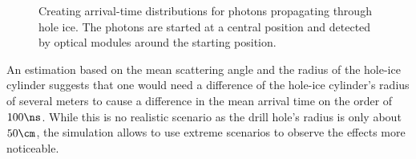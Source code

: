 
\begin{figure}[htbp]
  \hfill
  \caption{Creating arrival-time distributions for photons propagating through hole ice. The photons are started at a central position and detected by optical modules around the starting position.}
  \label{fig:eipau6Ag}
\end{figure}


An estimation based on the mean scattering angle and the radius of the hole-ice cylinder suggests that one would need a difference of the hole-ice cylinder's radius of several meters to cause a difference in the mean arrival time on the order of $100\ns$. While this is no realistic scenario as the drill hole's radius is only about $50\cm$, the simulation allows to use extreme scenarios to observe the effects more noticeable.

